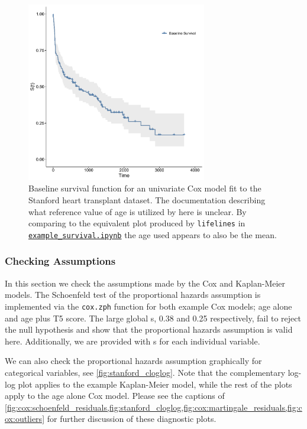 \begin{figure}[H]
\centering
\includegraphics[width=0.7\textwidth]{figures/survival/stanford_cox_age_baseline_survival}
\vspace{0.2cm}
\caption{
Baseline survival function for
an univariate Cox model fit to the Stanford heart transplant dataset.
The documentation describing what reference value of age is utilized by \R here is unclear.
By comparing to the equivalent plot produced by \texttt{lifelines} in
\href{https://github.com/mepland/data_science_notes/blob/main/sections/appendixes/additional/example_survival.ipynb}{\texttt{example\_survival.ipynb}}
the age used appears to also be the mean.
}
\label{fig:cox:cox_age_baseline_survival}
\end{figure}

\subsubsection{Checking Assumptions}
\label{additional:Survival:Rcode:assumptions}

In this section we check the assumptions made by the Cox and Kaplan-Meier models.
The Schoenfeld test of the proportional hazards assumption
is implemented via the \texttt{cox.zph} function
for both example Cox models; age alone and age plus T5 score.
The large global {\pvalue}s, \num{0.38} and \num{0.25} respectively,
fail to reject the null hypothesis and show that the
proportional hazards assumption is valid here.
Additionally, we are provided with {\pvalue}s for each individual variable.

We can also check the proportional hazards assumption graphically
for categorical variables, see \cref{fig:stanford_cloglog}.
Note that the complementary log-log plot applies to the example Kaplan-Meier model,
while the rest of the plots apply to the age alone Cox model.
Please see the captions of
\cref{fig:cox:schoenfeld_residuals,fig:stanford_cloglog,fig:cox:martingale_residuals,fig:cox:outliers}
for further discussion of these diagnostic plots.

